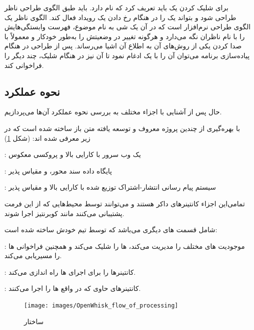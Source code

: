 برای شلیک کردن  یک  باید تعریف کرد که  نام دارد.  باید طبق الگوی طراحی ناظر طراحی شود و بتواند یک  را در هنگام رخ دادن یک رویداد فعال کند. الگوی ناظر یک الگوی طراحی نرم‌افزار است که در آن یک شی به نام موضوع، فهرست وابستگی‌هایش را با نام ناظران نگه می‌دارد و هرگونه تغییر در وضعیتش را به‌طور خودکار و معمولاً با صدا کردن یکی از روش‌های آن به اطلاع آن اشیا می‌رساند. پس از طراحی  در هنگام پیاده‌سازی برنامه می‌توان آن را با یک  ادغام نمود تا آن  نیز در هنگام شلیک، چند  دیگر را فراخوانی کند.

\newpage

\subsection{نحوه عملکرد }

حال پس از آشنایی با اجزاء مختلف  به بررسی نحوه عملکرد آن‌ها می‌پردازیم.

 با بهره‌گیری از چندین پروژه معروف و توسعه یافته متن باز ساخته شده است که در زیر معرفی شده اند: (شکل \ref{OpenWhisk_flow_of_processing})

\textbf{} : یک وب سرور با کارایی بالا و پروکسی معکوس

\textbf{} : پایگاه داده سند محور،  و مقیاس پذیر

\textbf{} : سیستم پیام رسانی انتشار-اشتراک توزیع شده با کارایی بالا و مقیاس پذیر

تمامی‌این اجزاء کانتینرهای داکر هستند و می‌توانند توسط محیط‌هایی که از این فرمت پشتیبانی می‌کنند مانند کوبرنتیز اجرا شوند.

 شامل قسمت های دیگری می‌باشد که توسط تیم خودش ساخته شده است:

\textbf{} : موجودیت های مختلف را مدیریت می‌کند،  ها را شلیک می‌کند و همچنین فراخوانی  ها را مسیریابی می‌کند.

\textbf{} : کانتینرها را برای اجرای  ها راه اندازی می‌کند.

\textbf{} : کانتینرهای حاوی  که در واقع  ها را اجرا می‌کنند.

\begin{figure}[!h]
	\centering
	\texttt{[image: images/OpenWhisk\_flow\_of\_processing]}
	\caption{ساختار }
	\label{OpenWhisk_flow_of_processing}
\end{figure}


